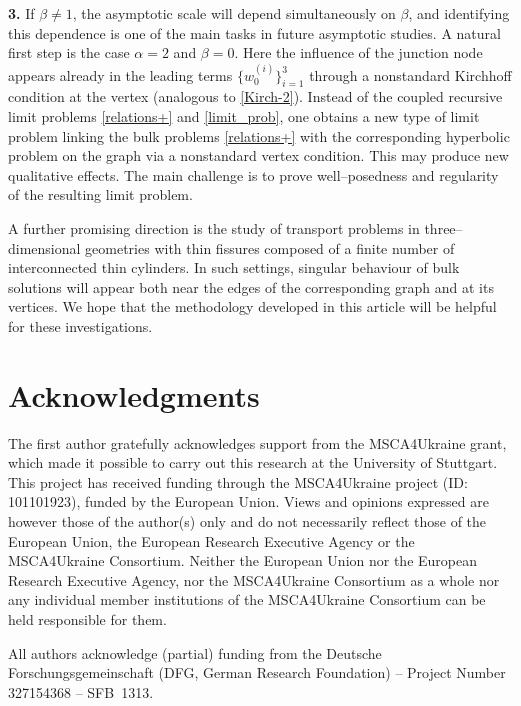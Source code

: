 \documentclass[reqno]{amsart}            %
\numberwithin{equation}{section}
\begin{document}
	\smallskip 
	
	\textbf{3.} 
	If $\beta\neq 1$, the asymptotic scale will depend simultaneously on
	$\beta$, and identifying this dependence is one of the main tasks in future
	asymptotic studies. A natural first step is the case $\alpha=2$ and $\beta=0$.
	Here the influence of the junction node appears already in the leading terms
	$\{w_0^{(i)}\}_{i=1}^3$ through a nonstandard Kirchhoff condition at the vertex
	(analogous to \eqref{Kirch-2}). Instead of the coupled recursive limit problems
	\eqref{relations+} and \eqref{limit_prob}, one obtains a new type of limit
	problem linking the bulk problems \eqref{relations+} with the corresponding
	hyperbolic problem on the graph via a nonstandard vertex condition. This may
	produce new qualitative effects. The main challenge is to prove well–posedness
	and regularity of the resulting limit problem.
	
	A further promising direction is the study of transport problems in
	three–dimensional geometries with thin fissures composed of a finite number of
	interconnected thin cylinders. In such settings, singular behaviour of bulk
	solutions will appear both near the edges of the corresponding graph and at its
	vertices. We hope that the methodology developed in this article will be
	helpful for these investigations.
	
	\section*{Acknowledgments}
	The first author gratefully acknowledges support from the MSCA4Ukraine grant, which made it possible to carry out this research at the University of Stuttgart. This project has received funding through the MSCA4Ukraine project (ID: 101101923), funded by the European Union.  Views and opinions expressed are however those of the author(s) only and do not 
	necessarily reflect those of the European Union, the European Research Executive Agency or the 
	MSCA4Ukraine Consortium. Neither the European Union nor the European Research Executive 
	Agency, nor the MSCA4Ukraine Consortium as a whole nor any individual member institutions of 
	the MSCA4Ukraine Consortium can be held responsible for them.
	
	All authors acknowledge  (partial) funding from the Deutsche Forschungsgemeinschaft (DFG, German Research Foundation) – Project Number 327154368 – SFB 1313.
	
\end{document}
